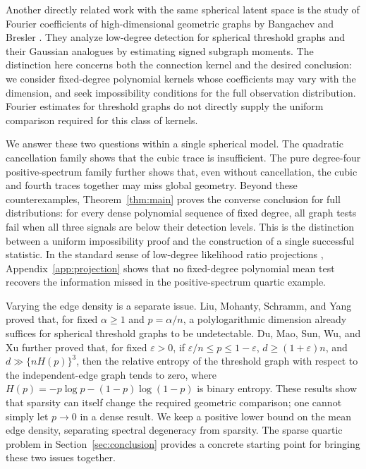 \documentclass[11pt,reqno]{amsart}
\numberwithin{equation}{section}
\theoremstyle{definition}
\theoremstyle{remark}
\theoremstyle{definition}
\begin{document}
Another directly related work with the same spherical latent space is
the study of Fourier coefficients of high-dimensional geometric graphs by Bangachev and Bresler \cite{BBfourier}.
They analyze low-degree detection for spherical threshold graphs and their Gaussian analogues by estimating signed subgraph moments.
The distinction here concerns both the connection kernel and the desired conclusion: we consider fixed-degree polynomial kernels whose coefficients may vary with the dimension,
and seek impossibility conditions for the full observation distribution.
Fourier estimates for threshold graphs do not directly supply the uniform comparison required for this class of kernels.

We answer these two questions within a single spherical model.
The quadratic cancellation family shows that the cubic trace is insufficient. The pure degree-four positive-spectrum family further shows that, even without cancellation,
the cubic and fourth traces together may miss global geometry.
Beyond these counterexamples, Theorem~\ref{thm:main} proves the converse conclusion for full distributions:
for every dense polynomial sequence of fixed degree, all graph tests fail when all three signals are below their detection levels.
This is the distinction between a uniform impossibility proof and the construction of a single successful statistic.
In the standard sense of low-degree likelihood ratio projections
\cite{KWB}, Appendix~\ref{app:projection} shows that no fixed-degree polynomial mean test recovers the information missed in the positive-spectrum quartic example.

Varying the edge density is a separate issue.
Liu, Mohanty, Schramm, and Yang \cite{LMSY} proved that,
for fixed $\alpha\ge1$ and $p=\alpha/n$, a polylogarithmic dimension already suffices for spherical threshold graphs to be undetectable.
Du, Mao, Sun, Wu, and Xu \cite[Theorem 1]{DMSWX} further proved that, for fixed $\varepsilon>0$,
if $\varepsilon/n\le p\le1-\varepsilon$, $d\ge(1+\varepsilon)n$, and
$d\gg\{nH(p)\}^3$, then the relative entropy of the threshold graph with respect to the independent-edge graph tends to zero,
where $H(p)=-p\log p-(1-p)\log(1-p)$ is binary entropy.
These results show that sparsity can itself change the required geometric comparison; one cannot simply let $p\to0$ in a dense result.
We keep a positive lower bound on the mean edge density, separating spectral degeneracy from sparsity.
The sparse quartic problem in Section~\ref{sec:conclusion} provides a concrete starting point for bringing these two issues together.
\end{document}

